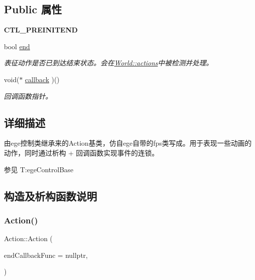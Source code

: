 \subsection*{Public 属性}
\begin{DoxyCompactItemize}
\item 
\mbox{\label{class_action_a682e7ba0a9ef3f891382df776c1ce883}} 
{\bfseries C\+T\+L\+\_\+\+P\+R\+E\+I\+N\+I\+T\+E\+ND}
\item 
\mbox{\label{class_action_a28332e6535d45661d768bb1b321f4715}} 
bool \hyperlink{class_action_a28332e6535d45661d768bb1b321f4715}{end}
\begin{DoxyCompactList}\small\item\em 表征动作是否已到达结束状态。会在\hyperlink{class_world_aefe8e0e9e418bbf81671314bf8d019f2}{World\+::actions}中被检测并处理。 \end{DoxyCompactList}\item 
\mbox{\label{class_action_aef6c7c00b09ea1b0ddd7a26926309717}} 
void($\ast$ \hyperlink{class_action_aef6c7c00b09ea1b0ddd7a26926309717}{callback} )()
\begin{DoxyCompactList}\small\item\em 回调函数指针。 \end{DoxyCompactList}\end{DoxyCompactItemize}


\subsection{详细描述}
由ege控制类继承来的\+Action基类，仿自ege自带的fps类写成。用于表现一些动画的动作，同时通过析构 + 回调函数实现事件的连锁。 

\begin{DoxySeeAlso}{参见}
T\+:ege\+Control\+Base


\end{DoxySeeAlso}


\subsection{构造及析构函数说明}
\mbox{\label{class_action_a5c92cef33ffb1fbf67d7d65e3f74a361}} 
\subsubsection{\texorpdfstring{Action()}{Action()}}
{\footnotesize\ttfamily Action\+::\+Action (\begin{DoxyParamCaption}\item[{void($\ast$)()}]{end\+Callback\+Func = {\ttfamily nullptr},  }\item[{C\+T\+L\+\_\+\+D\+E\+F\+P\+A\+R\+AM}]{ }\end{DoxyParamCaption})\hspace{0.3cm}{\ttfamily [inline]}}



